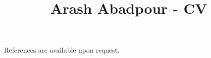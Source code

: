\documentclass[12pt,a4paper]{moderncv}
\title{Arash Abadpour - CV}
\begin{document}
\maketitle



















\vspace{1cm}
References are available upon request.


\end{document}
